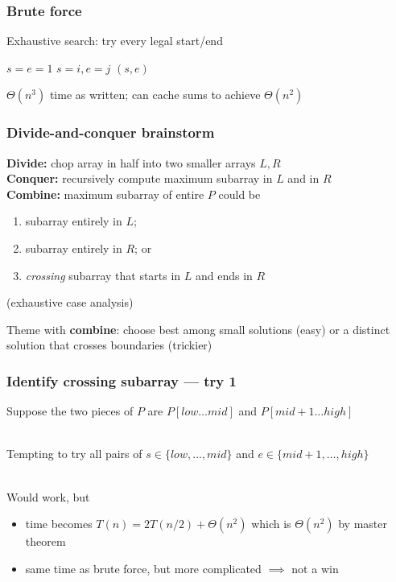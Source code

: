 \documentclass[10pt,aspectratio=169]{beamer}
\newcommand{\stanza}{ \\~\ }
\begin{document}
\begin{frame} \frametitle{Brute force}
  Exhaustive search: try every legal start/end

  \begin{algorithmic}[1]
    \State $s = e = 1$
          \State $s=i, e=j$
        \EndIf
      \EndFor
    \EndFor
    \State \Return $(s, e)$
    \EndFunction
  \end{algorithmic}

  $\Theta(n^3)$ time as written; can cache sums to achieve
  $\Theta(n^2)$

\end{frame}

\begin{frame} \frametitle{Divide-and-conquer brainstorm}
\textbf{Divide:} chop array in half into two smaller arrays $L, R$\\
\textbf{Conquer:} recursively compute maximum subarray in $L$ and in $R$ \\
\textbf{Combine:} maximum subarray of entire $P$ could be
\begin{enumerate}
  \item subarray entirely in $L$;
  \item subarray entirely in $R$; or
  \item \emph{crossing} subarray that starts in $L$ and ends in $R$
\end{enumerate}
(exhaustive case analysis)

Theme with \textbf{combine}: choose best among small solutions (easy) or
a distinct solution that crosses boundaries (trickier)
\end{frame}

\begin{frame} \frametitle{Identify crossing subarray --- try 1}
Suppose the two pieces of $P$ are $P[low \ldots mid]$ and
  $P[mid+1 \ldots high]$ \stanza

Tempting to try all pairs of $s \in \{low, \ldots, mid \}$ and
$e \in \{mid+1, \ldots, high\}$ \stanza

Would work, but
\begin{itemize}
  \item time becomes $T(n) = 2 T(n/2) + \Theta(n^2)$ which is $\Theta(n^2)$
    by master theorem
  \item same time as brute force, but more complicated $\implies$ not a win
\end{itemize}
\end{frame}
\end{document}
